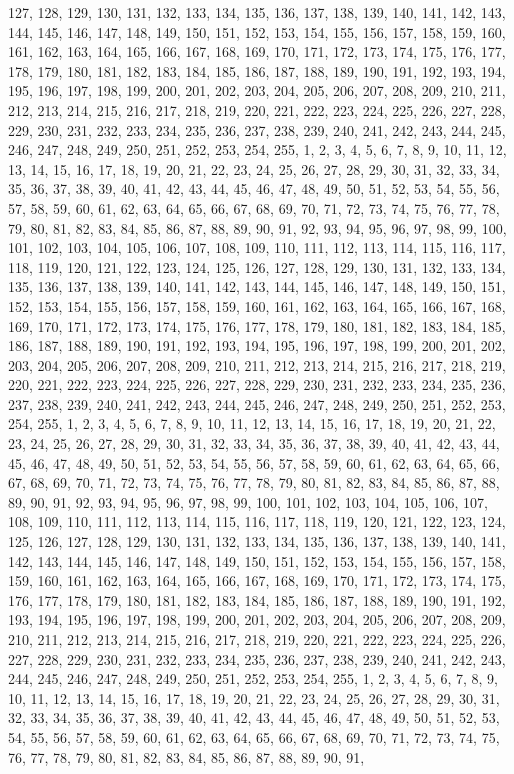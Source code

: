 127, 128, 129, 130, 131, 132, 133, 134, 135, 136, 137, 138, 139, 140, 141, 142, 143, 144, 145, 146, 147, 148, 149, 150, 151, 152, 153, 154, 155, 156, 157, 158, 159, 160, 161, 162, 163, 164, 165, 166, 167, 168, 169, 170, 171, 172, 173, 174, 175, 176, 177, 178, 179, 180, 181, 182, 183, 184, 185, 186, 187, 188, 189, 190, 191, 192, 193, 194, 195, 196, 197, 198, 199, 200, 201, 202, 203, 204, 205, 206, 207, 208, 209, 210, 211, 212, 213, 214, 215, 216, 217, 218, 219, 220, 221, 222, 223, 224, 225, 226, 227, 228, 229, 230, 231, 232, 233, 234, 235, 236, 237, 238, 239, 240, 241, 242, 243, 244, 245, 246, 247, 248, 249, 250, 251, 252, 253, 254, 255, 1, 2, 3, 4, 5, 6, 7, 8, 9, 10, 11, 12, 13, 14, 15, 16, 17, 18, 19, 20, 21, 22, 23, 24, 25, 26, 27, 28, 29, 30, 31, 32, 33, 34, 35, 36, 37, 38, 39, 40, 41, 42, 43, 44, 45, 46, 47, 48, 49, 50, 51, 52, 53, 54, 55, 56, 57, 58, 59, 60, 61, 62, 63, 64, 65, 66, 67, 68, 69, 70, 71, 72, 73, 74, 75, 76, 77, 78, 79, 80, 81, 82, 83, 84, 85, 86, 87, 88, 89, 90, 91, 92, 93, 94, 95, 96, 97, 98, 99, 100, 101, 102, 103, 104, 105, 106, 107, 108, 109, 110, 111, 112, 113, 114, 115, 116, 117, 118, 119, 120, 121, 122, 123, 124, 125, 126, 127, 128, 129, 130, 131, 132, 133, 134, 135, 136, 137, 138, 139, 140, 141, 142, 143, 144, 145, 146, 147, 148, 149, 150, 151, 152, 153, 154, 155, 156, 157, 158, 159, 160, 161, 162, 163, 164, 165, 166, 167, 168, 169, 170, 171, 172, 173, 174, 175, 176, 177, 178, 179, 180, 181, 182, 183, 184, 185, 186, 187, 188, 189, 190, 191, 192, 193, 194, 195, 196, 197, 198, 199, 200, 201, 202, 203, 204, 205, 206, 207, 208, 209, 210, 211, 212, 213, 214, 215, 216, 217, 218, 219, 220, 221, 222, 223, 224, 225, 226, 227, 228, 229, 230, 231, 232, 233, 234, 235, 236, 237, 238, 239, 240, 241, 242, 243, 244, 245, 246, 247, 248, 249, 250, 251, 252, 253, 254, 255, 1, 2, 3, 4, 5, 6, 7, 8, 9, 10, 11, 12, 13, 14, 15, 16, 17, 18, 19, 20, 21, 22, 23, 24, 25, 26, 27, 28, 29, 30, 31, 32, 33, 34, 35, 36, 37, 38, 39, 40, 41, 42, 43, 44, 45, 46, 47, 48, 49, 50, 51, 52, 53, 54, 55, 56, 57, 58, 59, 60, 61, 62, 63, 64, 65, 66, 67, 68, 69, 70, 71, 72, 73, 74, 75, 76, 77, 78, 79, 80, 81, 82, 83, 84, 85, 86, 87, 88, 89, 90, 91, 92, 93, 94, 95, 96, 97, 98, 99, 100, 101, 102, 103, 104, 105, 106, 107, 108, 109, 110, 111, 112, 113, 114, 115, 116, 117, 118, 119, 120, 121, 122, 123, 124, 125, 126, 127, 128, 129, 130, 131, 132, 133, 134, 135, 136, 137, 138, 139, 140, 141, 142, 143, 144, 145, 146, 147, 148, 149, 150, 151, 152, 153, 154, 155, 156, 157, 158, 159, 160, 161, 162, 163, 164, 165, 166, 167, 168, 169, 170, 171, 172, 173, 174, 175, 176, 177, 178, 179, 180, 181, 182, 183, 184, 185, 186, 187, 188, 189, 190, 191, 192, 193, 194, 195, 196, 197, 198, 199, 200, 201, 202, 203, 204, 205, 206, 207, 208, 209, 210, 211, 212, 213, 214, 215, 216, 217, 218, 219, 220, 221, 222, 223, 224, 225, 226, 227, 228, 229, 230, 231, 232, 233, 234, 235, 236, 237, 238, 239, 240, 241, 242, 243, 244, 245, 246, 247, 248, 249, 250, 251, 252, 253, 254, 255, 1, 2, 3, 4, 5, 6, 7, 8, 9, 10, 11, 12, 13, 14, 15, 16, 17, 18, 19, 20, 21, 22, 23, 24, 25, 26, 27, 28, 29, 30, 31, 32, 33, 34, 35, 36, 37, 38, 39, 40, 41, 42, 43, 44, 45, 46, 47, 48, 49, 50, 51, 52, 53, 54, 55, 56, 57, 58, 59, 60, 61, 62, 63, 64, 65, 66, 67, 68, 69, 70, 71, 72, 73, 74, 75, 76, 77, 78, 79, 80, 81, 82, 83, 84, 85, 86, 87, 88, 89, 90, 91, 